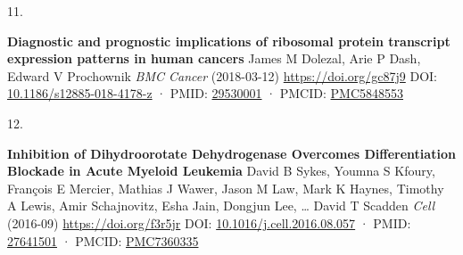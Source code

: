 \documentclass[
]{article}
\newlength{\cslhangindent}
\newlength{\csllabelwidth}
\newlength{\cslentryspacingunit} %
\newenvironment{CSLReferences}[2] %
 {%
  \setlength{\parindent}{0pt}
  \ifodd #1
  \let\oldpar\par
  \def\par{\hangindent=\cslhangindent\oldpar}
  \fi
  \setlength{\parskip}{#2\cslentryspacingunit}
 }%
 {}
\newcommand{\CSLBlock}[1]{#1\hfill\break}
\newcommand{\CSLLeftMargin}[1]{\parbox[t]{\csllabelwidth}{#1}}
\newcommand{\CSLRightInline}[1]{\parbox[t]{\linewidth - \csllabelwidth}{#1}\break}
\begin{document}
\begin{CSLReferences}{0}{0}
\leavevmode{}%
\CSLLeftMargin{11. }
\CSLRightInline{\textbf{Diagnostic and prognostic implications of ribosomal protein transcript expression patterns in human cancers}
\CSLBlock{James M Dolezal, Arie P Dash, Edward V Prochownik} \emph{BMC Cancer} (2018-03-12) \url{https://doi.org/gc87j9}
\CSLBlock{DOI: \href{https://doi.org/10.1186/s12885-018-4178-z}{10.1186/s12885-018-4178-z} · PMID: \href{https://www.ncbi.nlm.nih.gov/pubmed/29530001}{29530001} · PMCID: \href{https://www.ncbi.nlm.nih.gov/pmc/articles/PMC5848553}{PMC5848553}}}

\leavevmode{}%
\CSLLeftMargin{12. }
\CSLRightInline{\textbf{Inhibition of Dihydroorotate Dehydrogenase Overcomes Differentiation Blockade in Acute Myeloid Leukemia}
\CSLBlock{David B Sykes, Youmna S Kfoury, François E Mercier, Mathias J Wawer, Jason M Law, Mark K Haynes, Timothy A Lewis, Amir Schajnovitz, Esha Jain, Dongjun Lee, \ldots{} David T Scadden} \emph{Cell} (2016-09) \url{https://doi.org/f3r5jr}
\CSLBlock{DOI: \href{https://doi.org/10.1016/j.cell.2016.08.057}{10.1016/j.cell.2016.08.057} · PMID: \href{https://www.ncbi.nlm.nih.gov/pubmed/27641501}{27641501} · PMCID: \href{https://www.ncbi.nlm.nih.gov/pmc/articles/PMC7360335}{PMC7360335}}}

\end{CSLReferences}
\end{document}
